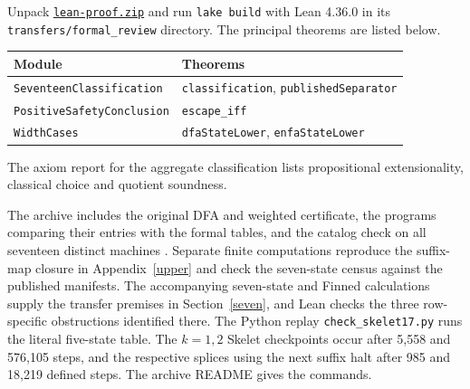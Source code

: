 \documentclass[11pt]{article}
\newcommand{\word}[1]{\texttt{#1}}
\begin{document}
Unpack \href{https://github.com/maxilism/busy-beaver-research/raw/refs/heads/main/support/verification/bb-5-2/regular-separation/lean-proof.zip}{\word{lean-proof.zip}} and run \word{lake build} with Lean 4.36.0 in its \word{transfers/formal\_review} directory. The principal theorems are listed below.
\begin{center}\small
\begin{tabular}{@{}ll@{}}
\toprule
Module & Theorems \\
\midrule
\word{SeventeenClassification} & \word{classification}, \word{publishedSeparator}\\
\word{PositiveSafetyConclusion} & \word{escape\_iff}\\
\word{WidthCases} & \word{dfaStateLower}, \word{enfaStateLower}\\
\bottomrule
\end{tabular}
\end{center}
The axiom report for the aggregate classification lists propositional extensionality, classical choice and quotient soundness.

The archive includes the original DFA and weighted certificate, the programs comparing their entries with the formal tables, and the catalog check on all seventeen distinct machines \cite{coq,weights,dfa}. Separate finite computations reproduce the suffix-map closure in Appendix~\ref{upper} and check the seven-state census against the published manifests. The accompanying seven-state and Finned calculations supply the transfer premises in Section~\ref{seven}, and Lean checks the three row-specific obstructions identified there. The Python replay \word{check\_skelet17.py} runs the literal five-state table. The \(k=1,2\) Skelet checkpoints occur after 5,558 and 576,105 steps, and the respective splices using the next suffix halt after 985 and 18,219 defined steps. The archive README gives the commands.
\end{document}
